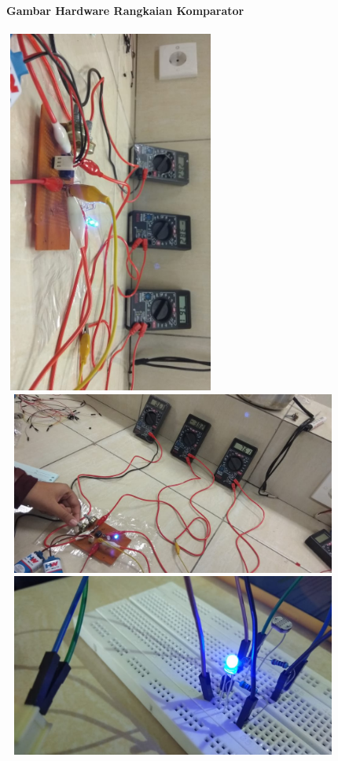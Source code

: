 \documentclass[12pt,a4paper]{article}
\begin{document}
\newpage
\begin{figure}
\paragraph{Gambar Hardware Rangkaian Komparator}
\paragraph{ }
\begin{center}

\includegraphics[width=7cm, height=12cm]{g1.png}

\includegraphics[width=12cm, height=6cm]{g2.png}

\includegraphics[width=12cm, height=6cm]{g3.png}
\end{center}
\end{figure}
\vspace{2cm}
\end{document}
